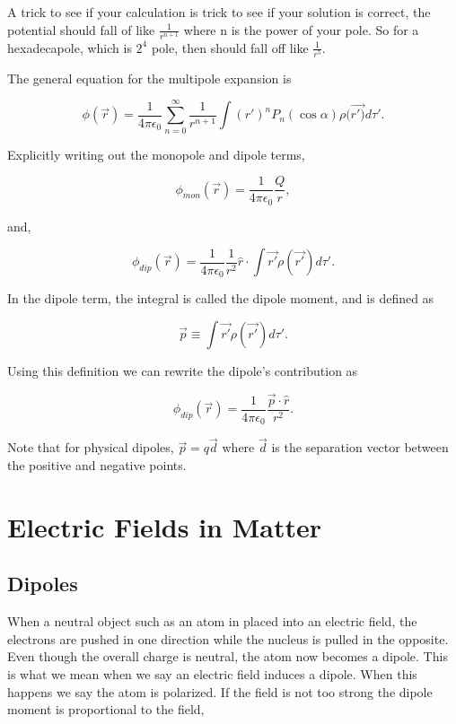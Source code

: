 \documentclass[preprint, review,12pt]{elsarticle}
\def\k{\frac{1}{4 \pi \epsilon_0}}
\def\.{\cdot}
\begin{document}
A trick to see if your calculation is trick to see if your solution is correct, the potential should fall of like $\frac{1}{r^{n+1}}$ where n is the power of your pole. So for a hexadecapole, which is $2^4$ pole, then should fall off like $\frac{1}{r^5}$.

The general equation for the multipole expansion is

\begin{equation}
    \phi(\vec{r}) = \frac{1}{4\pi \epsilon_0} \sum_{n=0}^\infty \frac{1}{r^{n+1}} \int (r')^n P_n(\cos \alpha ) \rho(\vec{r')}d\tau'.
\end{equation}


Explicitly writing out the monopole and dipole terms,

\begin{equation}
    \phi_{mon}(\vec{r}) = \k \frac{Q}{r},
\end{equation}

and,

\begin{equation}
    \phi_{dip}(\vec{r}) = \frac{1}{4 \pi \epsilon_0}\frac{1}{r^2}\hat{r}\. \int \vec{r'}\rho(\vec{r'})d\tau'.
\end{equation}

In the dipole term, the integral is called the dipole moment, and is defined as

\begin{equation}
    \vec{p} \equiv \int\vec{r'} \rho(\vec{r'})d\tau'.
\end{equation}

Using this definition we can rewrite the dipole's contribution as

\begin{equation}
    \phi_{dip}(\vec{r}) = \k\frac{\vec{p}\. \hat{r}}{r^2}.
\end{equation}

Note that for physical dipoles, $\vec{p} = q\vec{d}$ where $\vec{d}$ is the separation vector between the positive and negative points.

\section{Electric Fields in Matter}

\subsection{Dipoles}

When a neutral object such as an atom in placed into an electric field, the electrons are pushed in one direction while the nucleus is pulled in the opposite. Even though the overall charge is neutral, the atom now becomes a dipole. This is what we mean when we say an electric field induces a dipole. When this happens we say the atom is polarized. If the field is not too strong the dipole moment is proportional to the field,
\end{document}

